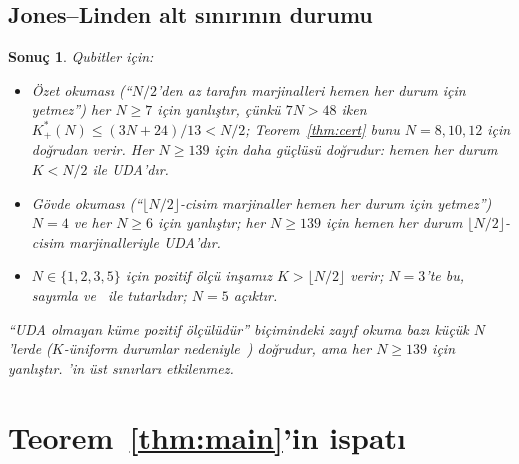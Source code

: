 \documentclass[aps,pra,onecolumn,superscriptaddress,nofootinbib,longbibliography,10pt]{revtex4-2}
\newtheorem{corollary}[proposition]{Sonuç}
\theoremstyle{definition}
\newcommand{\Kp}{K^{*}_{+}}
\begin{document}
\subsection{Jones--Linden alt sınırının durumu}
\begin{corollary}\label{cor:JL}
Qubitler için:
\begin{itemize}
\item Özet okuması (``$N/2$'den az tarafın marjinalleri hemen her durum için yetmez'') her $N\ge7$ için yanlıştır, çünkü $7N>48$ iken $\Kp(N)\le(3N+24)/13<N/2$; Teorem~\ref{thm:cert} bunu $N=8{,}10{,}12$ için doğrudan verir. Her $N\ge139$ için daha güçlüsü doğrudur: hemen her durum $K<N/2$ ile UDA'dır.
\item Gövde okuması (``$\lfloor N/2\rfloor$-cisim marjinaller hemen her durum için yetmez'') $N=4$ ve her $N\ge6$ için yanlıştır; her $N\ge139$ için hemen her durum $\lfloor N/2\rfloor$-cisim marjinalleriyle UDA'dır.
\item $N\in\{1{,}2{,}3{,}5\}$ için pozitif ölçü inşamız $K>\lfloor N/2\rfloor$ verir; $N=3$'te bu, sayımla ve~\cite{LPW02} ile tutarlıdır; $N=5$ açıktır.
\end{itemize}
``UDA olmayan küme pozitif ölçülüdür'' biçimindeki zayıf okuma bazı küçük $N$'lerde ($K$-üniform durumlar nedeniyle~\cite{HG16}) doğrudur, ama her $N\ge139$ için yanlıştır. \cite{JL05,HCLZ18}'in üst sınırları etkilenmez.
\end{corollary}

\section{Teorem~\ref{thm:main}'in ispatı}\label{sec:proof1}
\end{document}
